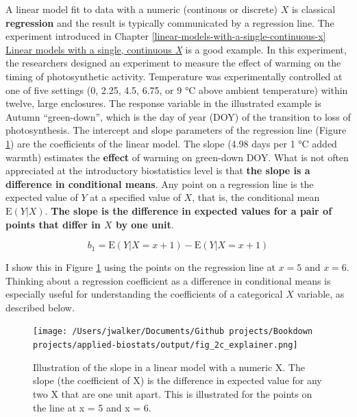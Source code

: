 \documentclass[]{book}
\begin{document}
A linear model fit to data with a numeric (continous or discrete) \(X\) is classical \textbf{regression} and the result is typically communicated by a regression line. The experiment introduced in Chapter \ref{linear-models-with-a-single-continuous-x} \protect\hyperlink{linear-models-with-a-single-continuous-x}{Linear models with a single, continuous \emph{X}} is a good example. In this experiment, the researchers designed an experiment to measure the effect of warming on the timing of photosynthetic activity. Temperature was experimentally controlled at one of five settings (0, 2.25, 4.5, 6.75, or 9 °C above ambient temperature) within twelve, large enclosures. The response variable in the illustrated example is Autumn ``green-down'', which is the day of year (DOY) of the transition to loss of photosynthesis. The intercept and slope parameters of the regression line (Figure \ref{fig:intro-linear-models-cont-slope}) are the coefficients of the linear model. The slope (4.98 days per 1 °C added warmth) estimates the \textbf{effect} of warming on green-down DOY. What is not often appreciated at the introductory biostatistics level is that \textbf{the slope is a difference in conditional means}. Any point on a regression line is the expected value of \(Y\) at a specified value of \(X\), that is, the conditional mean \(\mathrm{E}(Y|X)\). \textbf{The slope is the difference in expected values for a pair of points that differ in \(X\) by one unit}.

\begin{equation}
b_1 = \mathrm{E}(Y|X=x+1) - \mathrm{E}(Y|X=x+1)
\end{equation}

I show this in Figure \ref{fig:intro-linear-models-cont-slope} using the points on the regression line at \(x = 5\) and \(x = 6\). Thinking about a regression coefficient as a difference in conditional means is especially useful for understanding the coefficients of a categorical \(X\) variable, as described below.

\begin{figure}
\centering
\texttt{[image: /Users/jwalker/Documents/Github projects/Bookdown projects/applied-biostats/output/fig\_2c\_explainer.png]}
\caption{\label{fig:intro-linear-models-cont-slope}Illustration of the slope in a linear model with a numeric X. The slope (the coefficient of X) is the difference in expected value for any two X that are one unit apart. This is illustrated for the points on the line at x = 5 and x = 6.}
\end{figure}
\end{document}
